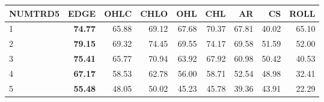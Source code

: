 \begin{table}[ht]
\centering
\begin{tabular}{lrrrrrrrr}
  \hline
NUMTRD5 & EDGE & OHLC & CHLO & OHL & CHL & AR & CS & ROLL \\ 
  \hline
1 & \textbf{74.77} & 65.88 & 69.12 & 67.68 & 70.37 & 67.81 & 40.02 & 65.10 \\ 
  2 & \textbf{79.15} & 69.32 & 74.45 & 69.55 & 74.17 & 69.58 & 51.59 & 52.00 \\ 
  3 & \textbf{75.41} & 65.77 & 70.94 & 63.92 & 67.92 & 60.98 & 50.42 & 40.53 \\ 
  4 & \textbf{67.17} & 58.53 & 62.78 & 56.00 & 58.71 & 52.54 & 48.98 & 32.41 \\ 
  5 & \textbf{55.48} & 48.05 & 50.02 & 45.23 & 45.78 & 39.36 & 43.91 & 22.29 \\ 
   \hline
\end{tabular}
\end{table}
